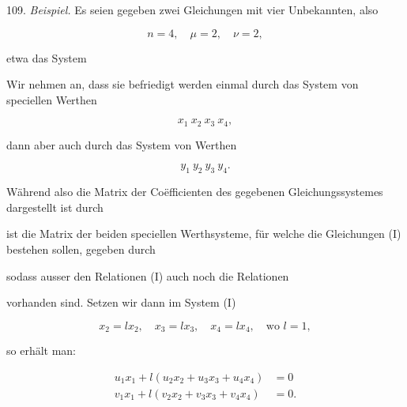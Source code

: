 109. \textit{Beispiel.} Es seien gegeben zwei Gleichungen mit vier Unbekannten, also

\[
n=4,\quad \mu=2,\quad \nu=2,
\]

etwa das System


Wir nehmen an, dass sie befriedigt werden einmal durch das System von speciellen Werthen

\[
x_1\ x_2\ x_3\ x_4,
\]

dann aber auch durch das System von Werthen

\[
y_1\ y_2\ y_3\ y_4.
\]



Während also die Matrix der Co\"efficienten des gegebenen Gleichungssystemes dargestellt ist durch


ist die Matrix der beiden speciellen Werthsysteme, für welche die Gleichungen (I) bestehen sollen, gegeben durch


sodass ausser den Relationen (I) auch noch die Relationen


vorhanden sind. Setzen wir dann im System (I)

\[ x_2=lx_2,\quad x_3=lx_3,\quad x_4=lx_4,\quad \text{wo } l=1, \]

so erhält man:

\[ \begin{aligned} u_1x_1+l(u_2x_2+u_3x_3+u_4x_4)&=0\\ v_1x_1+l(v_2x_2+v_3x_3+v_4x_4)&=0. \end{aligned} \]

